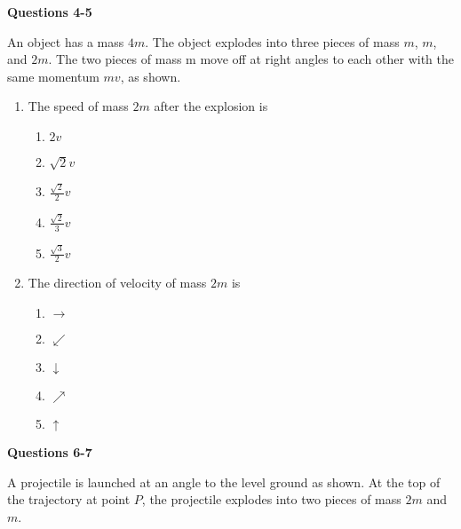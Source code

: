 \documentclass{../../oss-apphys}
\begin{document}
\begin{multicols}{2}
\begin{enumerate}[leftmargin=18pt]
  \end{enumerate}
  \columnbreak
  
  \textbf{Questions 4-5}

  An object has a mass $4m$. The object explodes into three pieces of mass
  $m$, $m$, and $2m$. The two pieces of mass m move off at right
  angles to each other with the same momentum $mv$, as shown.
  \begin{center}
  \end{center}
  \begin{enumerate}[leftmargin=18pt,resume]
  \item The speed of mass $2m$ after the explosion is
    \begin{enumerate}[noitemsep,topsep=0pt,leftmargin=18pt,label=(\Alph*)]
    \item $2v$
    \item $\displaystyle\sqrt{2}v$
    \item $\displaystyle\frac{\sqrt{2}}{2}v$
    \item $\displaystyle\frac{\sqrt{2}}{3}v$
    \item $\displaystyle\frac{\sqrt{3}}{2}v$
    \end{enumerate}
    
  \item  The direction of velocity of mass $2m$ is
    \begin{enumerate}[noitemsep,topsep=0pt,leftmargin=18pt,label=(\Alph*)]
    \item $\rightarrow$
    \item $\swarrow$
    \item $\downarrow$
    \item $\nearrow$
    \item $\uparrow$
    \end{enumerate}
  \end{enumerate}

  \columnbreak
  \textbf{Questions 6-7}

  A projectile is launched at an angle to the level ground as shown. At the top
  of the trajectory at point $P$, the projectile explodes into two pieces of
  mass $2m$ and $m$.
  \begin{center}
  \end{center}


\end{multicols}
\end{document}
